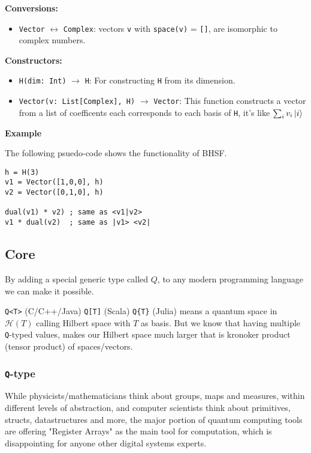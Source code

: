 \documentclass[a4paper,11pt]{article}
\def\co{\lstinline}
\begin{document}
\textbf{Conversions: }

\begin{itemize}
	\item \co|Vector| \(\leftrightarrow\) \co|Complex|: vectors \co|v| with \co|space(v)| = \co|[]|, are isomorphic to complex numbers.
\end{itemize}

\textbf{Constructors: }

\begin{itemize}
	\item \co|H(dim: Int)| \(\to\) \co|H|: For constructing \co|H| from its dimension.
	\item \co|Vector(v: List[Complex], H)| \(\to\) \co|Vector|: This function constructs a vector from a list of coefficents each corresponds to each basis of \co|H|, it's like $\sum_i v_i \ket{i}$
\end{itemize}

\textbf{Example}

The following psuedo-code shows the functionality of BHSF.

\begin{lstlisting}
h = H(3)
v1 = Vector([1,0,0], h)
v2 = Vector([0,1,0], h)

dual(v1) * v2) ; same as <v1|v2>
v1 * dual(v2)  ; same as |v1> <v2|
\end{lstlisting}

\subsection{Core}

By adding a special generic type called $Q$, to any modern programming language we can make it possible.

\co{Q<T>} (C/C++/Java) \co{Q[T]} (Scala) \co|Q{T}| (Julia) means a quantum space in $\mathcal{H}(T)$ calling Hilbert space with $T$ as basis. But we know that having multiple \co{Q}-typed values, makes our Hilbert space much larger that is kronoker product (tensor product) of spaces/vectors.

\subsubsection{\co|Q|-type}
While physicists/mathematicians think about groups, maps and measures, within different levels of abstraction, and computer scientists think about primitives, structs, datastructures and more, the major portion of quantum computing tools are offering "Register Arrays" as the main tool for computation, which is disappointing for anyone other digital systems experts.
\end{document}
